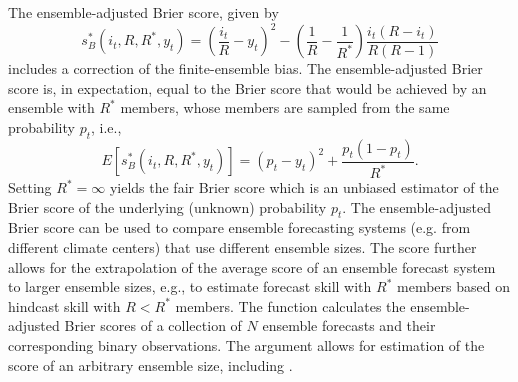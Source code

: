 \documentclass[article]{jss}\usepackage[]{graphicx}\usepackage[]{color}
\begin{document}
The ensemble-adjusted Brier score, given by \citep{ferro2008effect}
%
\begin{equation}
s_{B}^*(i_t, R, R^*, y_t) = \left(\frac{i_t}{R} - y_t\right)^2 - \left(\frac{1}{R} - \frac{1}{R^*}\right)\frac{i_t(R-i_t)}{R(R-1)}
\label{eq:ens-brier}
\end{equation}
%
includes a correction of the finite-ensemble bias.
The ensemble-adjusted Brier score is, in expectation, equal to the Brier score that would be achieved by an ensemble with $R^*$ members, whose members are sampled from the same probability $p_t$, i.e., 
%
\begin{equation}
E\left[s_{B}^*(i_t, R, R^*, y_t)\right] = (p_t - y_t)^2 + \frac{p_t(1-p_t)}{R^*}.
\end{equation}
%
Setting $R^*=\infty$ yields the fair Brier score \citep{ferro2013fair} which is an unbiased estimator of the Brier score of the underlying (unknown) probability $p_t$.
The ensemble-adjusted Brier score can be used to compare ensemble forecasting systems (e.g. from different climate centers) that use different ensemble sizes.
The score further allows for the extrapolation of the average score of an ensemble forecast system to larger ensemble sizes, e.g., to estimate forecast skill with $R^*$ members based on hindcast skill with $R<R^*$ members.
The  function  calculates the ensemble-adjusted Brier scores of a collection of $N$ ensemble forecasts and their corresponding binary observations. 
The argument  allows for estimation of the score of an arbitrary ensemble size, including .
\end{document}
